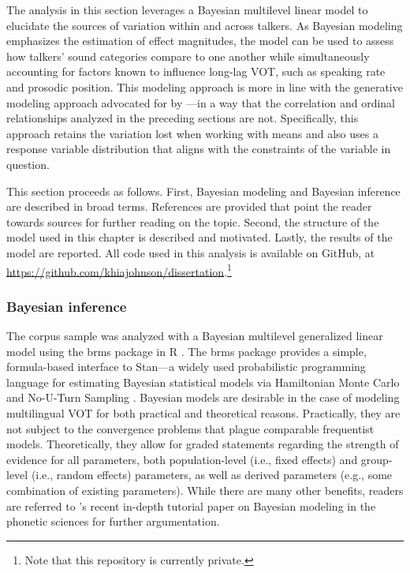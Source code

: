 The analysis in this section leverages a Bayesian multilevel linear model to elucidate the sources of variation within and across talkers. As Bayesian modeling emphasizes the estimation of effect magnitudes, the model can be used to assess how talkers' sound categories compare to one another while simultaneously accounting for factors known to influence long-lag VOT, such as speaking rate and prosodic position. This modeling approach is more in line with the generative modeling approach advocated for by \citet{haines_2020_theoretically}---in a way that the correlation and ordinal relationships analyzed in the preceding sections are not. Specifically, this approach retains the variation lost when working with means and also uses a response variable distribution that aligns with the constraints of the variable in question. 

This section proceeds as follows. First, Bayesian modeling and Bayesian inference are described in broad terms. References are provided that point the reader towards sources for further reading on the topic. Second, the structure of the model used in this chapter is described and motivated. Lastly, the results of the model are reported. All code used in this analysis is available on GitHub, at \url{https://github.com/khiajohnson/dissertation}.\footnote{Note that this repository is currently private.}

\subsubsection{Bayesian inference}

The corpus sample was analyzed with a Bayesian multilevel generalized linear model using the brms package in R \citep{burkner_2017_brms, r_2021}. The brms package provides a simple, formula-based interface to Stan---a widely used probabilistic programming language for estimating Bayesian statistical models via Hamiltonian Monte Carlo and No-U-Turn Sampling \citep{stan_2021}. Bayesian models are desirable in the case of modeling multilingual VOT for both practical and theoretical reasons. Practically, they are not subject to the convergence problems that plague comparable frequentist models. Theoretically, they allow for graded statements regarding the strength of evidence for all parameters, both population-level (i.e., fixed effects) and group-level (i.e., random effects) parameters, as well as derived parameters (e.g., some combination of existing parameters). While there are many other benefits, readers are referred to \citeauthor{vasishth_2018_bayesian}'s \citeyearpar{vasishth_2018_bayesian} recent in-depth tutorial paper on Bayesian modeling in the phonetic sciences for further argumentation. 

